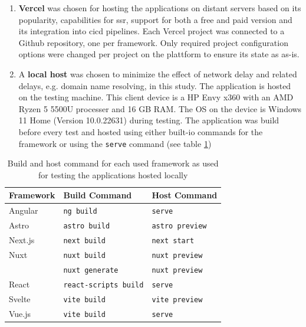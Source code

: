 \documentclass[a4paper, 12pt]{article}
\begin{document}
\begin{enumerate}
  \item \textbf{Vercel} was chosen for hosting the applications on distant servers based on its popularity, capabilities for \acrfull{ssr}, support for both a free and paid version and its integration into \acrshort{cicd} pipelines.
  Each Vercel project was connected to a Github repository, one per framework.
  Only required project configuration options were changed per project on the plattform to ensure its state as as-is.
  \item A \textbf{local host} was chosen to minimize the effect of network delay and related delays, e.g. domain name resolving, in this study.
  The application is hosted on the testing machine.
  This client device is a HP Envy x360 with an AMD Ryzen 5 5500U processer and 16 GB RAM.
  The OS on the device is Windows 11 Home (Version 10.0.22631) during testing.
  The application was build before every test and hosted using either built-io commands for the framework or using the \verb|serve| command (see table \ref{tab:hostCommands})
\end{enumerate}

\begin{table}[h]
  \begin{center}
    \begin{tabular}[h]{| l | l | l |}
      \hline
      \textbf{Framework} & \textbf{Build Command} & \textbf{Host Command} \\ \hline
      Angular & \verb|ng build| & \verb|serve| \\ \hline
      Astro & \verb|astro build| & \verb|astro preview| \\ \hline
      Next.js & \verb|next build| & \verb|next start| \\ \hline
      Nuxt & \verb|nuxt build| & \verb|nuxt preview| \\
      & \verb|nuxt generate| & \verb|nuxt preview| \\ \hline
      React & \verb|react-scripts build| & \verb|serve| \\ \hline
      Svelte & \verb|vite build| & \verb|vite preview| \\ \hline
      Vue.js & \verb|vite build| & \verb|serve| \\ \hline
    \end{tabular}
  \end{center}
  \caption{Build and host command for each used framework as used for testing the applications hosted locally}\label{tab:hostCommands}
\end{table}
\end{document}
